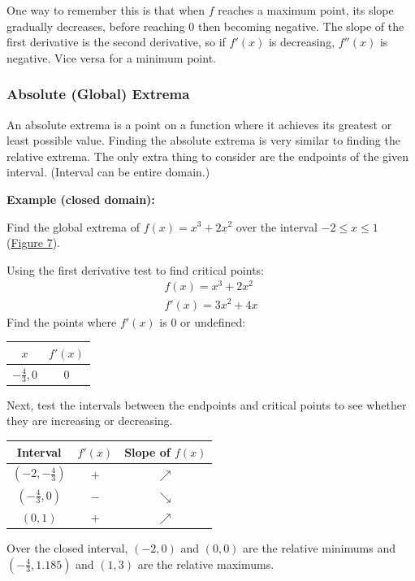 \documentclass[12pt]{article}
\begin{document}
One way to remember this is that when $f$ reaches a maximum point, its slope gradually decreases, before reaching $0$ then becoming negative. The slope of the first derivative is the second derivative, so if $f'(x)$ is decreasing, $f''(x)$ is negative. Vice versa for a minimum point.

\subsubsection{Absolute (Global) Extrema}
An absolute extrema is a point on a function where it achieves its greatest or least possible value. Finding the absolute extrema is very similar to finding the relative extrema. The only extra thing to consider are the endpoints of the given interval. (Interval can be entire domain.)

\noindent \textbf{Example (closed domain):}

\noindent Find the global extrema of $f(x) = x^3+2x^2$ over the interval $-2 \le x \le 1$ (\hyperref[fig:absextremaclosed]{Figure 7}).

\noindent Using the first derivative test to find critical points:
\begin{gather*}
    f(x) = x^3 + 2x^2 \\
    f'(x) = 3x^2 + 4x
\end{gather*}
Find the points where $f'(x)$ is $0$ or undefined:
\begin{center}
    \begin{tabular}{|c|c|}
        \hline
        $x$               & $f'(x)$ \\
        \hline \hline
        $-\frac{4}{3}, 0$ & $0$     \\
        \hline
    \end{tabular}
\end{center}
Next, test the intervals between the endpoints and critical points to see whether they are increasing or decreasing.
\begin{center}
    \begin{tabular}{|c|c|c|}
        \hline
        Interval             & $f'(x)$ & Slope of $f(x)$ \\
        \hline \hline
        $(-2, -\frac{4}{3})$ & $+$     & $\nearrow$      \\
        \hline
        $(-\frac{4}{3}, 0)$  & $-$     & $\searrow$      \\
        \hline
        $(0, 1)$             & $+$     & $\nearrow$      \\
        \hline
    \end{tabular}
\end{center}
Over the closed interval, $(-2, 0)$ and $(0, 0)$ are the relative minimums and $(-\frac{4}{3}, 1.185)$ and $(1, 3)$ are the relative maximums.
\end{document}
